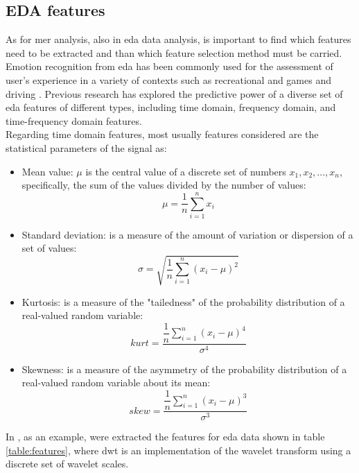 \subsection{EDA features}
As for \gls{mer} analysis, also in \gls{eda} data analysis, is important to find which features need to be extracted and than which feature selection method must be carried.
\\ \indent
Emotion recognition from \gls{eda} has been commonly used for the assessment of user's experience in a variety of contexts such as recreational and games \cite{drachen2010correlation} and driving \cite{healey2005detecting}. Previous research has explored the predictive power of a diverse set of \gls{eda} features of different types, including time domain, frequency domain, and time-frequency domain features.
\\ \indent
Regarding time domain features, most usually features considered are the statistical parameters of the signal as:
\begin{itemize}
	\item Mean value: $\mu$ is the central value of a discrete set of numbers $x_1,x_2,...,x_n$, specifically, the sum of the values divided by the number of values:
		\begin{equation}
		\mu=\dfrac{1}{n} \sum_{i=1}^{n}{x_i}
		\end{equation}
	\item Standard deviation:  is a measure of the amount of variation or dispersion of a set of values:
		\begin{equation}
		\sigma=\sqrt{\dfrac{1}{n}\sum_{i=1}^{n}({x_i-\mu})^2}
		\end{equation}
	\item Kurtosis: is a measure of the "tailedness" of the probability distribution of a real-valued random variable:
		\begin{equation}
		kurt=\dfrac{\dfrac{1}{n} \sum_{i=1}^{n}{(x_i-\mu)^4}}{\sigma^4}
		\end{equation}
	\item Skewness: is a measure of the asymmetry of the probability distribution of a real-valued random variable about its mean:
		\begin{equation}
		skew=\dfrac{\dfrac{1}{n} \sum_{i=1}^{n}{(x_i-\mu)^3}}{\sigma^3}
		\end{equation}
\end{itemize}
In \cite{shukla2019feature}, as an example, were extracted the features for \gls{eda} data shown in table \ref{table:features}, where \gls{dwt} is an implementation of the wavelet transform using a discrete set of wavelet scales.
